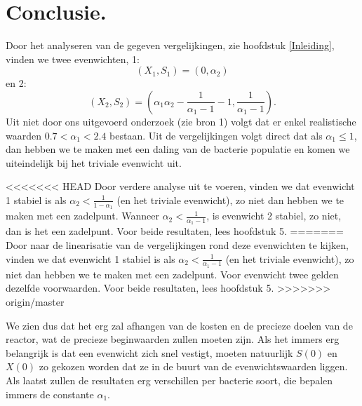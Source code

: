 
\chapter{Conclusie.}
Door het analyseren van de gegeven vergelijkingen, zie hoofdstuk \ref{Inleiding}, vinden we twee evenwichten, 1:
\[ 
	 (X_1, S_1) = (0, \alpha_2)
\]
en 2:
\[
	(X_2, S_2) =\left( \alpha_1\alpha_2 - \frac{1}{\alpha_1 - 1} - 1, \frac{1}{\alpha_1 - 1}\right).
\] 
Uit niet door ons uitgevoerd onderzoek (zie bron 1) volgt dat er enkel realistische waarden $0.7 < \alpha_1 < 2.4$ bestaan. Uit de vergelijkingen volgt direct dat als $\alpha_1 \leq 1$, dan hebben we te maken met een daling van de bacterie populatie en komen we uiteindelijk bij het triviale evenwicht uit. 

<<<<<<< HEAD
Door verdere analyse uit te voeren, vinden we dat evenwicht 1 stabiel is als $\alpha_2 < \frac{1}{1 - \alpha_1}$ (en het triviale evenwicht), zo niet dan hebben we te maken met een zadelpunt. Wanneer $\alpha_2 < \frac{1}{\alpha_1 - 1}$, is evenwicht 2 stabiel, zo niet, dan is het een zadelpunt. Voor beide resultaten, lees hoofdstuk 5. 
=======
Door naar de linearisatie van de vergelijkingen rond deze evenwichten te kijken, vinden we dat evenwicht 1 stabiel is als $\alpha_2 < \frac{1}{\alpha_1 - 1}$ (en het triviale evenwicht), zo niet dan hebben we te maken met een zadelpunt. Voor evenwicht twee gelden dezelfde voorwaarden. Voor beide resultaten, lees hoofdstuk 5. 
>>>>>>> origin/master

We zien dus dat het erg zal afhangen van de kosten en de precieze doelen van de reactor, wat de precieze beginwaarden zullen moeten zijn. Als het immers erg belangrijk is dat een evenwicht zich snel vestigt, moeten natuurlijk $S(0)$ en $X(0)$ zo gekozen worden dat ze in de buurt van de evenwichtswaarden liggen. Als laatst zullen de resultaten erg verschillen per bacterie soort, die bepalen immers de constante $\alpha_1$. 

